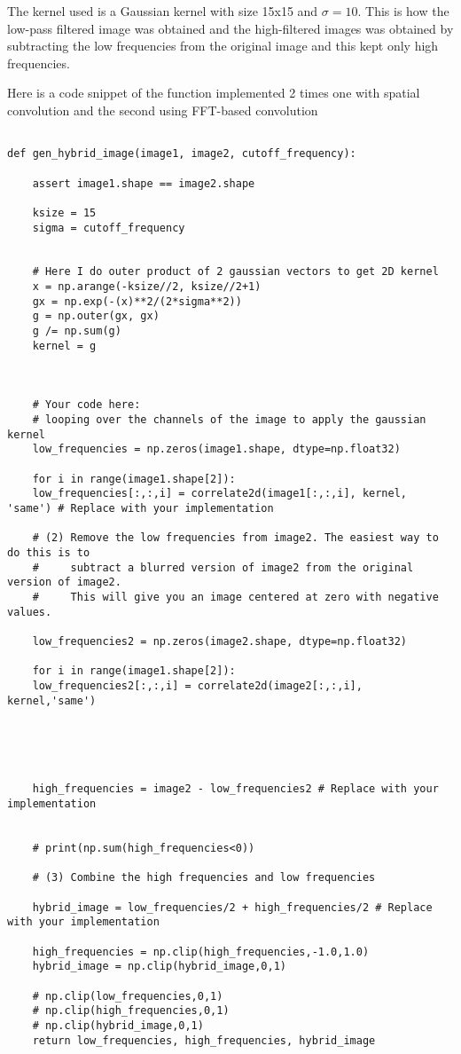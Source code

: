 The kernel used is a Gaussian kernel with size 15x15 and $\sigma = 10$.
This is how the low-pass filtered image was obtained and the high-filtered images was obtained by subtracting the low frequencies from the original image and this kept only high frequencies. 



Here is a code snippet of the function implemented 2 times one with spatial convolution and the second using FFT-based convolution


\begin{lstlisting}

def gen_hybrid_image(image1, image2, cutoff_frequency):
	
	assert image1.shape == image2.shape
	
	ksize = 15
	sigma = cutoff_frequency
	
	
	# Here I do outer product of 2 gaussian vectors to get 2D kernel
	x = np.arange(-ksize//2, ksize//2+1)
	gx = np.exp(-(x)**2/(2*sigma**2))
	g = np.outer(gx, gx)
	g /= np.sum(g)
	kernel = g
	
	
	
	# Your code here:
	# looping over the channels of the image to apply the gaussian kernel
	low_frequencies = np.zeros(image1.shape, dtype=np.float32)
	
	for i in range(image1.shape[2]):
	low_frequencies[:,:,i] = correlate2d(image1[:,:,i], kernel, 'same') # Replace with your implementation
	
	# (2) Remove the low frequencies from image2. The easiest way to do this is to
	#     subtract a blurred version of image2 from the original version of image2.
	#     This will give you an image centered at zero with negative values.
	
	low_frequencies2 = np.zeros(image2.shape, dtype=np.float32)
	
	for i in range(image1.shape[2]):
	low_frequencies2[:,:,i] = correlate2d(image2[:,:,i], kernel,'same')
	
	
	
	
	
	high_frequencies = image2 - low_frequencies2 # Replace with your implementation
	
	
	# print(np.sum(high_frequencies<0))
	
	# (3) Combine the high frequencies and low frequencies
	
	hybrid_image = low_frequencies/2 + high_frequencies/2 # Replace with your implementation
	
	high_frequencies = np.clip(high_frequencies,-1.0,1.0)
	hybrid_image = np.clip(hybrid_image,0,1)

	# np.clip(low_frequencies,0,1)
	# np.clip(high_frequencies,0,1)
	# np.clip(hybrid_image,0,1)
	return low_frequencies, high_frequencies, hybrid_image


\end{lstlisting}

